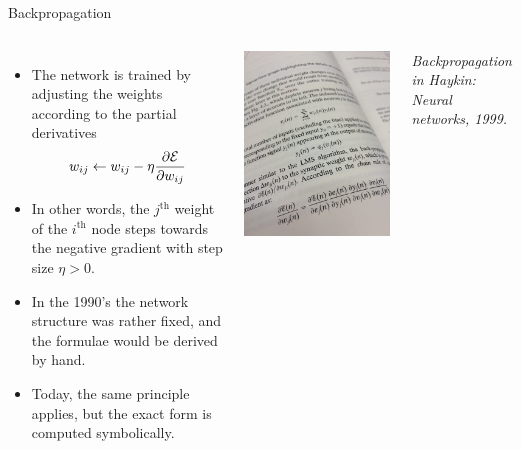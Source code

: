 \documentclass[10pt, aspectratio=169]{beamer} %
\begin{document}
\begin{frame}{Backpropagation}
	\begin{columns}
	\begin{itemize}
		\item The network is trained by adjusting the weights according to the partial derivatives
		\[
		w_{ij} \leftarrow w_{ij} - \eta \frac{\partial {\cal E}}{\partial w_{ij}}
		\]

		\item In other words, the $j^\text{th}$ weight of the $i^\text{th}$ node 
		steps towards the negative gradient with step size $\eta > 0$.
		
		\item In the 1990's the network structure was rather fixed, and the formulae 
		would be derived by hand.
		
		\item Today, the same principle applies, but the exact form is computed symbolically.
		\end{itemize}
		
	\includegraphics[width=\textwidth]{backpropagation.png}
	
	\emph{Backpropagation in Haykin: Neural networks, 1999.}
	\end{columns}
\end{frame}
\end{document}
